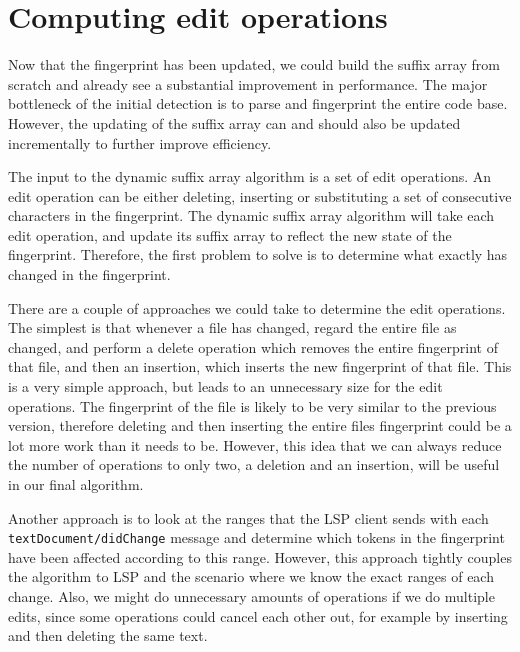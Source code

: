 

\section{Computing edit operations}

Now that the fingerprint has been updated, we could build the suffix array from scratch
and already see a substantial improvement in performance. The major bottleneck of the initial
detection is to parse and fingerprint the entire code base. However, the updating of the
suffix array can and should also be updated incrementally to further improve efficiency.

The input to the dynamic suffix array algorithm is a set of edit operations. An edit
operation can be either deleting, inserting or substituting a set of consecutive
characters in the fingerprint. The dynamic suffix array algorithm will take each edit
operation, and update its suffix array to reflect the new state of the fingerprint.
Therefore, the first problem to solve is to determine what exactly has changed in the
fingerprint. 

There are a couple of approaches we could take to determine the edit operations. The
simplest is that whenever a file has changed, regard the entire file as changed, and
perform a delete operation which removes the entire fingerprint of that file, and then an
insertion, which inserts the new fingerprint of that file. This is a very simple approach,
but leads to an unnecessary size for the edit operations. The fingerprint of the file is
likely to be very similar to the previous version, therefore deleting and then inserting
the entire files fingerprint could be a lot more work than it needs to be. However, this
idea that we can always reduce the number of operations to only two, a deletion and an
insertion, will be useful in our final algorithm.

Another approach is to look at the ranges that the LSP client sends with each
\verb|textDocument/didChange| message and determine which tokens in the fingerprint have
been affected according to this range. However, this approach tightly couples the
algorithm to LSP and the scenario where we know the exact ranges of each change. Also, we
might do unnecessary amounts of operations if we do multiple edits, since some operations
could cancel each other out, for example by inserting and then deleting the same text.

